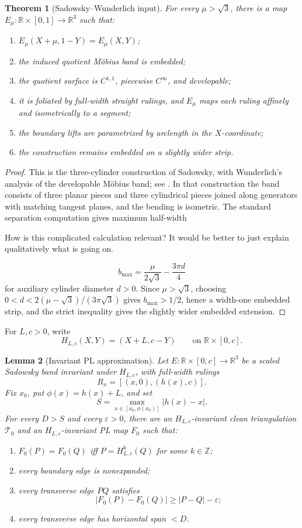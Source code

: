 \documentclass[12pt]{article}
\newcommand{\R}{\mathbb R}
\newcommand{\Z}{\mathbb Z}
\theoremstyle{plain}
\newtheorem{theorem}{Theorem}
\newtheorem{lemma}[theorem]{Lemma}
\newcommand{\review}[1]{\begin{reviewbox}#1\end{reviewbox}}
\begin{document}
\begin{theorem}[Sadowsky--Wunderlich input]\label{thm:sadowsky}
For every \(\mu>\sqrt3\), there is a map
\(E_\mu:\R\times[0,1]\to\R^3\) such that:
\begin{enumerate}
\item \(E_\mu(X+\mu,1-Y)=E_\mu(X,Y)\);
\item the induced quotient M\"obius band is embedded;
\item the quotient surface is \(C^{1,1}\), piecewise \(C^\infty\), and
developable;
\item it is foliated by full-width straight rulings, and \(E_\mu\) maps each
ruling affinely and isometrically to a segment;
\item the boundary lifts are parametrized by arclength in the \(X\)-coordinate;
\item the construction remains embedded on a slightly wider strip.
\end{enumerate}
\end{theorem}

\begin{proof}
This is the three-cylinder construction of Sadowsky, with Wunderlich's
analysis of the developable M\"obius band; see \cite{Sad30,Wun62}.  In that
construction the band consists of three planar pieces and three cylindrical
pieces joined along generators with matching tangent planes, and the bending is
isometric.  The standard separation computation gives maximum half-width


\review{How is this complicated calculation relevant?  It would be better to just explain qualitatively what is going on.}

\[
b_{\max}=\frac{\mu}{2\sqrt3}-\frac{3\pi d}{4}
\]
for auxiliary cylinder diameter \(d>0\).  Since \(\mu>\sqrt3\), choosing
\(0<d<2(\mu-\sqrt3)/(3\pi\sqrt3)\) gives \(b_{\max}>1/2\), hence a width-one
embedded strip, and the strict inequality gives the slightly wider embedded
extension.
\end{proof}

For \(L,c>0\), write
\[
H_{L,c}(X,Y)=(X+L,c-Y)\qquad\text{on }\R\times[0,c].
\]

\begin{lemma}[Invariant PL approximation]\label{lem:PL}
Let \(E:\R\times[0,c]\to\R^3\) be a scaled Sadowsky band invariant under
\(H_{L,c}\), with full-width rulings
\[
R_x=[(x,0),(h(x),c)].
\]
Fix \(x_0\), put \(\phi(x)=h(x)+L\), and set
\[
S=\max_{x\in[x_0,\phi(x_0)]}|h(x)-x|.
\]
For every \(D>S\) and every \(\varepsilon>0\), there are an
\(H_{L,c}\)-invariant clean triangulation \(\mathcal T_0\) and an
\(H_{L,c}\)-invariant PL map \(F_0\) such that:
\begin{enumerate}
\item \(F_0(P)=F_0(Q)\) iff \(P=H_{L,c}^k(Q)\) for some \(k\in\Z\);
\item every boundary edge is nonexpanded;
\item every transverse edge \(PQ\) satisfies
\[
|F_0(P)-F_0(Q)|\ge |P-Q|-\varepsilon;
\]
\item every transverse edge has horizontal span \(<D\).
\end{enumerate}
\end{lemma}
\end{document}
